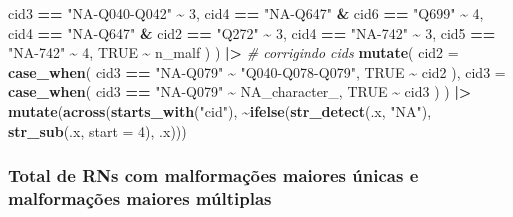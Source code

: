 \documentclass[
]{article}
\newenvironment{Shaded}{\begin{snugshade}}{\end{snugshade}}
\newcommand{\AttributeTok}[1]{\textcolor[rgb]{0.13,0.29,0.53}{#1}}
\newcommand{\CommentTok}[1]{\textcolor[rgb]{0.56,0.35,0.01}{\textit{#1}}}
\newcommand{\ConstantTok}[1]{\textcolor[rgb]{0.56,0.35,0.01}{#1}}
\newcommand{\DecValTok}[1]{\textcolor[rgb]{0.00,0.00,0.81}{#1}}
\newcommand{\FunctionTok}[1]{\textcolor[rgb]{0.13,0.29,0.53}{\textbf{#1}}}
\newcommand{\NormalTok}[1]{#1}
\newcommand{\SpecialCharTok}[1]{\textcolor[rgb]{0.81,0.36,0.00}{\textbf{#1}}}
\newcommand{\StringTok}[1]{\textcolor[rgb]{0.31,0.60,0.02}{#1}}
\begin{document}
\begin{Shaded}
\begin{Highlighting}[]
\NormalTok{      cid3 }\SpecialCharTok{==} \StringTok{"NA{-}Q040{-}Q042"} \SpecialCharTok{\textasciitilde{}} \DecValTok{3}\NormalTok{, cid4 }\SpecialCharTok{==} \StringTok{"NA{-}Q647"} \SpecialCharTok{\&}\NormalTok{ cid6 }\SpecialCharTok{==} \StringTok{"Q699"} \SpecialCharTok{\textasciitilde{}} \DecValTok{4}\NormalTok{,}
\NormalTok{      cid4 }\SpecialCharTok{==} \StringTok{"NA{-}Q647"} \SpecialCharTok{\&}\NormalTok{ cid2 }\SpecialCharTok{==} \StringTok{"Q272"} \SpecialCharTok{\textasciitilde{}} \DecValTok{3}\NormalTok{, cid4 }\SpecialCharTok{==} \StringTok{"NA{-}742"} \SpecialCharTok{\textasciitilde{}} \DecValTok{3}\NormalTok{, cid5 }\SpecialCharTok{==} \StringTok{"NA{-}742"} \SpecialCharTok{\textasciitilde{}} \DecValTok{4}\NormalTok{,}
      \ConstantTok{TRUE} \SpecialCharTok{\textasciitilde{}}\NormalTok{ n\_malf}
\NormalTok{    )}
\NormalTok{  ) }\SpecialCharTok{|\textgreater{}}
  \CommentTok{\# corrigindo cids}
  \FunctionTok{mutate}\NormalTok{(}
    \AttributeTok{cid2 =} \FunctionTok{case\_when}\NormalTok{(}
\NormalTok{      cid3 }\SpecialCharTok{==} \StringTok{"NA{-}Q079"} \SpecialCharTok{\textasciitilde{}} \StringTok{"Q040{-}Q078{-}Q079"}\NormalTok{,}
      \ConstantTok{TRUE} \SpecialCharTok{\textasciitilde{}}\NormalTok{ cid2}
\NormalTok{    ),}
    \AttributeTok{cid3 =} \FunctionTok{case\_when}\NormalTok{(}
\NormalTok{      cid3 }\SpecialCharTok{==} \StringTok{"NA{-}Q079"} \SpecialCharTok{\textasciitilde{}} \ConstantTok{NA\_character\_}\NormalTok{,}
      \ConstantTok{TRUE} \SpecialCharTok{\textasciitilde{}}\NormalTok{ cid3}
\NormalTok{    )}
\NormalTok{  ) }\SpecialCharTok{|\textgreater{}}
  \FunctionTok{mutate}\NormalTok{(}\FunctionTok{across}\NormalTok{(}\FunctionTok{starts\_with}\NormalTok{(}\StringTok{"cid"}\NormalTok{), }\SpecialCharTok{\textasciitilde{}}\FunctionTok{ifelse}\NormalTok{(}\FunctionTok{str\_detect}\NormalTok{(.x, }\StringTok{"NA"}\NormalTok{), }\FunctionTok{str\_sub}\NormalTok{(.x, }\AttributeTok{start =} \DecValTok{4}\NormalTok{), .x)))}
\end{Highlighting}
\end{Shaded}

\hypertarget{total-de-rns-com-malformauxe7uxf5es-maiores-uxfanicas-e-malformauxe7uxf5es-maiores-muxfaltiplas}{%
\subsubsection{Total de RNs com malformações maiores únicas e
malformações maiores
múltiplas}\label{total-de-rns-com-malformauxe7uxf5es-maiores-uxfanicas-e-malformauxe7uxf5es-maiores-muxfaltiplas}}
\end{document}
